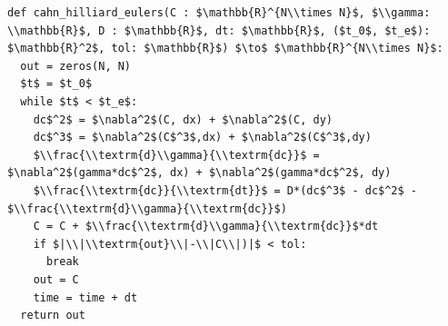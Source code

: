 \documentclass[border=10pt]{standalone}
\begin{document}
\begin{lstlisting}
def cahn_hilliard_eulers(C : $\mathbb{R}^{N\\times N}$, $\\gamma: \\mathbb{R}$, D : $\mathbb{R}$, dt: $\mathbb{R}$, ($t_0$, $t_e$): $\mathbb{R}^2$, tol: $\mathbb{R}$) $\to$ $\mathbb{R}^{N\\times N}$:
  out = zeros(N, N)
  $t$ = $t_0$ 
  while $t$ < $t_e$:
    dc$^2$ = $\nabla^2$(C, dx) + $\nabla^2$(C, dy)
    dc$^3$ = $\nabla^2$(C$^3$,dx) + $\nabla^2$(C$^3$,dy)
    $\\frac{\\textrm{d}\\gamma}{\\textrm{dc}}$ = $\nabla^2$(gamma*dc$^2$, dx) + $\nabla^2$(gamma*dc$^2$, dy)
    $\\frac{\\textrm{dc}}{\\textrm{dt}}$ = D*(dc$^3$ - dc$^2$ - $\\frac{\\textrm{d}\\gamma}{\\textrm{dc}}$)
    C = C + $\\frac{\\textrm{d}\\gamma}{\\textrm{dc}}$*dt
    if $|\\|\\textrm{out}\\|-\\|C\\|)|$ < tol:
      break
    out = C
    time = time + dt
  return out
\end{lstlisting}
\end{document}
